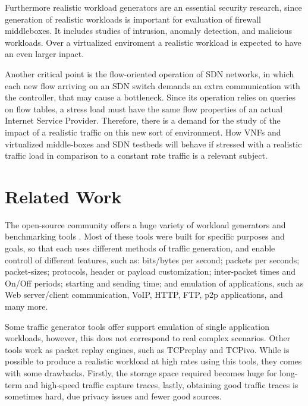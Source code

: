Furthermore realistic workload generators are an essential security research\cite{ditg-paper}, since generation of realistic workloads is important for evaluation of firewall middleboxes. It includes studies of intrusion, anomaly detection, and malicious workloads\cite{ditg-paper}. Over a virtualized enviroment a realistic workload is expected to have an even larger inpact.


Another critical point is the flow-oriented operation of SDN networks, in which each new flow arriving on an SDN switch demands an extra communication with the controller, that may cause a bottleneck. Since its operation relies on queries on flow tables, a stress load must have the same flow properties of an actual Internet Service Provider. Therefore, there is a demand for the study of the impact of a realistic traffic on this new sort of environment. How VNFs and virtualized middle-boxes and SDN testbeds will behave if stressed with a realistic traffic load in comparison to a constant rate traffic is a relevant subject.



\section{Related Work}


The open-source community offers a huge variety of workload generators and benchmarking tools \cite{ditg-paper}\cite{validate-trafficgen}\cite{comparative-trafficgen-tools}\cite{performance-trafficgen}. Most of these tools were built for specific purposes and goals, so that each uses different methods of traffic generation, and enable controll of different features, such as: bits/bytes per second; packets per seconds; packet-sizes; protocols, header or payload customization; inter-packet times and On/Off periods; starting and sending time; and emulation of applications, such as Web server/client communication, VoIP, HTTP, FTP, p2p applications, and many more.


Some traffic generator tools offer support emulation of single application workloads, however, this does not correspond to real complex scenarios. Other tools work as packet replay engines, such as TCPreplay and TCPivo. While is possible to produce a realistic workload at high rates using this tools, they comes with some drawbacks. Firstly, the storage space required becomes huge for long-term and high-speed traffic capture traces, lastly, obtaining good traffic traces is sometimes hard, due privacy issues and fewer good sources. 


